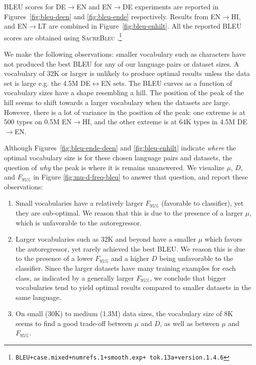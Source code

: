 BLEU scores for DE$\rightarrow$EN and EN$\rightarrow$DE experiments are reported in Figures~\ref{fig:bleu-deen} and \ref{fig:bleu-ende} respectively.
Results from EN$\rightarrow$HI, and EN$\rightarrow$LT are combined in Figure~\ref{fig:bleu-enhilt}.
All the reported BLEU scores are obtained using \textsc{SacreBleu} \cite{post-2018-sacrebleu}.\footnote{\texttt{BLEU+case.mixed+numrefs.1+smooth.exp+ tok.13a+version.1.4.6}}

We make the following observations: smaller vocabulary such as characters have not produced the best BLEU for any of our language pairs or dataset sizes. 
A vocabulary of 32K or larger is unlikely to produce optimal results unless the data set is large e.g. the 4.5M DE$\leftrightarrow$EN sets.
The BLEU curves as a function of vocabulary sizes have a shape resembling a hill. 
The position of the peak of the hill seems to shift towards a larger vocabulary when the datasets are large. 
However, there is a lot of variance in the position of the peak: one extreme is at 500 types on 0.5M EN$\rightarrow$HI, and the other extreme is at 64K types in 4.5M DE$\rightarrow$EN. 
    
Although Figures~\ref{fig:bleu-ende-deen} and \ref{fig:bleu-enhilt} indicate \textit{where} the optimal vocabulary size is for these chosen language pairs and datasets, the question of \textit{why} the peak is where it is remains unanswered.
We visualize $\mu$, $D$, and $F_{95\%}$ in Figure \ref{fig:mu-d-freq-bleu} to answer that question, and report these observations:
\begin{enumerate}
    \itemsep0em 
    \item Small vocabularies have a relatively larger $F_{95\%}$ (favorable to classifier), yet they are sub-optimal. We reason that this is due to the presence of a larger $\mu$, which is unfavorable to the autoregressor.
    \item Larger vocabularies such as 32K and beyond have a smaller $\mu$ which favors the autoregressor, yet rarely achieved the best BLEU.
    We reason this is due to the presence of a lower $F_{95\%}$ and a higher $D$ being unfavorable to the classifier.
    Since the larger datasets have many training examples for each class, as indicated by a generally larger $F_{95\%}$, we conclude that bigger vocabularies tend to yield optimal results compared to smaller datasets in the same language.
    
    \item On small (30K) to medium (1.3M) data sizes, the vocabulary size of 8K seems to find a good trade-off between $\mu$ and $D$, as well as between $\mu$ and $F_{95\%}$.
\end{enumerate}

